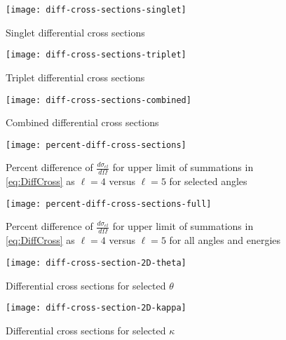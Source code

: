 \documentclass[Dissertation.tex]{subfiles}
\begin{document}
\begin{figure}[H]
	\centering
	\texttt{[image: diff-cross-sections-singlet]}
	\caption{Singlet differential cross sections}
	\label{fig:diff-cross-sections-singlet}
\end{figure}

\begin{figure}[H]
	\centering
	\texttt{[image: diff-cross-sections-triplet]}
	\caption{Triplet differential cross sections}
	\label{fig:diff-cross-sections-triplet}
\end{figure}

\begin{figure}[H]
	\centering
	\texttt{[image: diff-cross-sections-combined]}
	\caption{Combined differential cross sections}
	\label{fig:diff-cross-sections-combined}
\end{figure}

\begin{figure}[H]
	\centering
	\texttt{[image: percent-diff-cross-sections]}
	\caption[Percent difference of differential cross sections at selected angles]{Percent difference of $\frac{d\sigma_{el}}{d\Omega}$ for upper limit of summations in \ref{eq:DiffCross} as $\ell = 4$ versus $\ell = 5$ for selected angles}
	\label{fig:percent-diff-cross-sections}
\end{figure}

\begin{figure}[H]
	\centering
	\texttt{[image: percent-diff-cross-sections-full]}
	\caption[Percent difference of differential cross sections at all angles]{Percent difference of $\frac{d\sigma_{el}}{d\Omega}$ for upper limit of summations in \ref{eq:DiffCross} as $\ell = 4$ versus $\ell = 5$ for all angles and energies}
	\label{fig:percent-diff-cross-sections-full}
\end{figure}

\begin{figure}[H]
	\centering
	\texttt{[image: diff-cross-section-2D-theta]}
	\caption{Differential cross sections for selected $\theta$}
	\label{fig:diff-cross-section-2D-theta}
\end{figure}

\begin{figure}[H]
	\centering
	\texttt{[image: diff-cross-section-2D-kappa]}
	\caption{Differential cross sections for selected $\kappa$}
	\label{fig:diff-cross-section-2D-kappa}
\end{figure}
\end{document}
